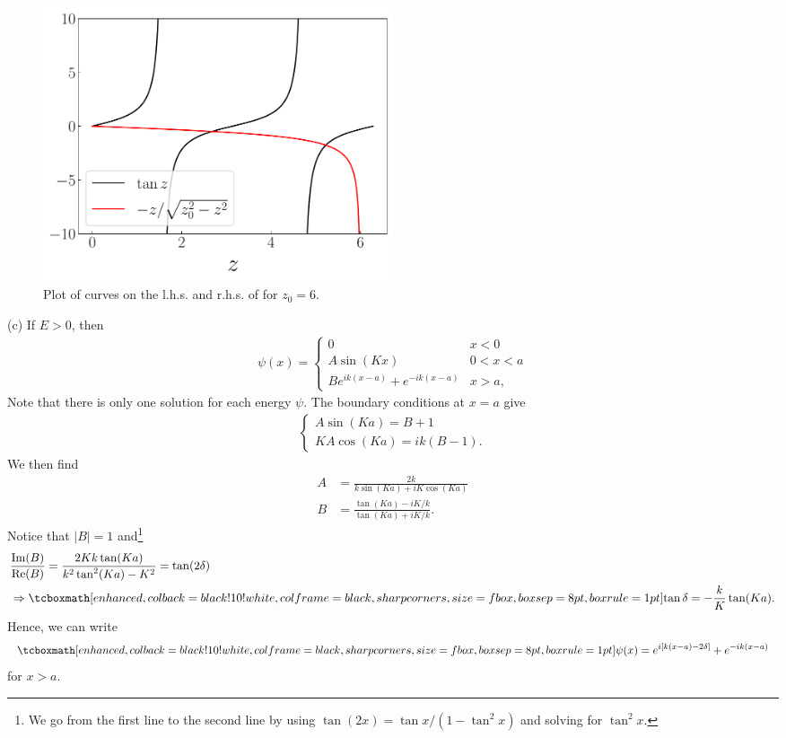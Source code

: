 {\begin{figure}[h!]
    \centering
    \includegraphics[width=0.5\textwidth]{prob3b.pdf}
    \caption{Plot of curves on the l.h.s. and r.h.s. of  for $z_0 = 6$.}
    \label{fig:prob3b}
\end{figure}

(c) If $E > 0$, then 
\begin{eqnarray}
   \psi(x) = \begin{cases}
       0 & x < 0 \\
       A \sin(Kx) & 0 < x < a \\
       B e^{i k (x-a)} + e^{-i k (x-a)} & x > a
   ,\end{cases}
\end{eqnarray}
Note that there is only one solution for each energy $\psi$.
The boundary conditions at $x = a$ give
\begin{eqnarray}
\begin{cases}
    A \sin(Ka) = B + 1 \\
    KA \cos(Ka) = ik(B - 1)
.\end{cases}
\end{eqnarray}
We then find
\begin{align}
    A &= \frac{2k}{k\sin(Ka) + iK \cos(Ka)} \\
    B &= \frac{\tan(Ka) - iK/k}{\tan(Ka) + iK/k}
.\end{align}
Notice that $|B| = 1$ and\footnote{We go from the first line to the second line by using $\tan(2x) = \tan{x}/(1 - \tan^2{x})$ and solving for $\tan^2{x}$.}
\begin{align}
    &\frac{\Im(B)}{\Re(B)} = \frac{2 K k \tan(Ka)}{k^2 \tan^2(Ka) - K^2} = \tan(2 \delta) \\
    &\Rightarrow \eqbox{ \tan \delta = -\frac{k}{K} \tan(Ka) }
.\end{align}
Hence, we can write
\begin{eqnarray}
    \eqbox{ \psi(x) = e^{i[k(x-a) - 2\delta]} + e^{-ik(x-a)} }
\end{eqnarray}
for $x > a$.

}
